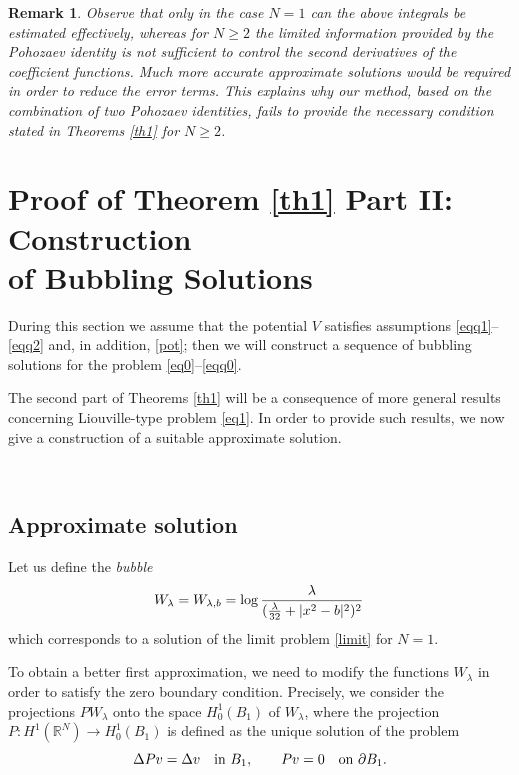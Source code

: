 \documentclass[reqno,11pt]{amsart}
\newtheorem{rmk}[thm]{Remark}
\theoremstyle{definition}
\numberwithin{equation}{section}
\newcommand{\R}{\mathbb{R}}
\newcommand{\la}{\lambda}
\renewcommand{\(}{\left(}
\renewcommand{\)}{\right)}
\renewcommand{\[}{\left[}
\renewcommand{\]}{\right]}
\begin{document}
{\begin{rmk}
Observe that only in the case $N=1$  can the above integrals be estimated effectively, whereas for $N\geq 2$    the limited information provided by the Pohozaev
identity  is not sufficient to control  the second derivatives of the coefficient functions. Much more accurate approximate solutions would be required in order  to reduce the error terms.   
 This explains why our method, based on the combination of two Pohozaev identities, 
fails to provide the necessary condition stated in Theorems \ref{th1} for $N\geq 2$. 
\end{rmk}



{\Large{\section{\bf{Proof of Theorem \ref{th1} Part II: Construction \\of Bubbling Solutions}}}}

During this section we assume that the potential $V$ satisfies assumptions \eqref{eqq1}--\eqref{eqq2} and, in addition, \eqref{pot}; then   we will construct a sequence of bubbling solutions for the problem \eqref{eq0}--\eqref{eqq0}.

The second part of Theorems \ref{th1} will be a consequence of  more general results concerning Liouville-type problem \eqref{eq1}. In order to provide such  results, we now give a construction of a suitable approximate solution. 

\

\subsection{{\large{Approximate solution}}} 
Let us define the \textit{bubble}
$$W_\la=W_{\la, b}=
\log  {\la\over (\frac{\la}{32}+|x^{2}- b|^2)^2}\,$$ which corresponds to a solution of the limit problem \eqref{limit} for $N=1$.

To obtain a better first approximation, we need to modify the functions $W_\la$   in order to satisfy the zero boundary condition. Precisely, we consider the projections $P W_\la $ onto the space $ H^1_0(B_1)$ of
$W_\la$, where the projection  $P:H^1(\R^N)\to  H^1_0(B_1)$ is
defined as the unique solution of the problem
$$
 \Delta P v=\Delta v\quad \hbox{in}\ B_1,\qquad  P v=0\quad \hbox{on}\ \partial B_1.
$$

}
\end{document}
